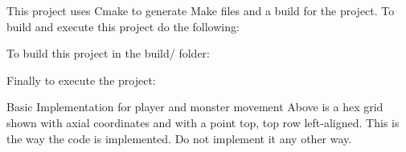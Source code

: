 This project uses Cmake to generate Make files and a build for the project. To build and execute this project do the following\+:


\begin{DoxyCode}{0}

\end{DoxyCode}


To build this project in the build/ folder\+:


\begin{DoxyCode}{0}

\end{DoxyCode}


Finally to execute the project\+:


\begin{DoxyCode}{0}

\end{DoxyCode}


Basic Implementation for player and monster movement  Above is a hex grid shown with axial coordinates and with a point top, top row left-\/aligned. This is the way the code is implemented. Do not implement it any other way. 